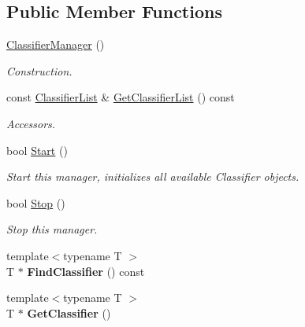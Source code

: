 \subsection*{Public Member Functions}
\begin{DoxyCompactItemize}
\item 
\mbox{\label{class_classifier_manager_a1af886a1f3c7bb0fe6a804978e6ef431}} 
\hyperlink{class_classifier_manager_a1af886a1f3c7bb0fe6a804978e6ef431}{Classifier\+Manager} ()
\begin{DoxyCompactList}\small\item\em Construction. \end{DoxyCompactList}\item 
\mbox{\label{class_classifier_manager_a76f262b018bee815fa1772edd665c61e}} 
const \hyperlink{class_classifier_manager_aae20ce0b00515992da2c2375decebdd3}{Classifier\+List} \& \hyperlink{class_classifier_manager_a76f262b018bee815fa1772edd665c61e}{Get\+Classifier\+List} () const
\begin{DoxyCompactList}\small\item\em Accessors. \end{DoxyCompactList}\item 
\mbox{\label{class_classifier_manager_a80379c1004db60dbd1c39baa522732b7}} 
bool \hyperlink{class_classifier_manager_a80379c1004db60dbd1c39baa522732b7}{Start} ()
\begin{DoxyCompactList}\small\item\em Start this manager, initializes all available Classifier objects. \end{DoxyCompactList}\item 
\mbox{\label{class_classifier_manager_ab4ba7a475ee06b7e58e557da8cf49b13}} 
bool \hyperlink{class_classifier_manager_ab4ba7a475ee06b7e58e557da8cf49b13}{Stop} ()
\begin{DoxyCompactList}\small\item\em Stop this manager. \end{DoxyCompactList}\item 
\mbox{\label{class_classifier_manager_aa9710c99ee57697553c8d6329dfc409f}} 
{\footnotesize template$<$typename T $>$ }\\T $\ast$ {\bfseries Find\+Classifier} () const
\item 
\mbox{\label{class_classifier_manager_ad811cdc506ae96eecc90f055b01bea69}} 
{\footnotesize template$<$typename T $>$ }\\T $\ast$ {\bfseries Get\+Classifier} ()
\end{DoxyCompactItemize}


